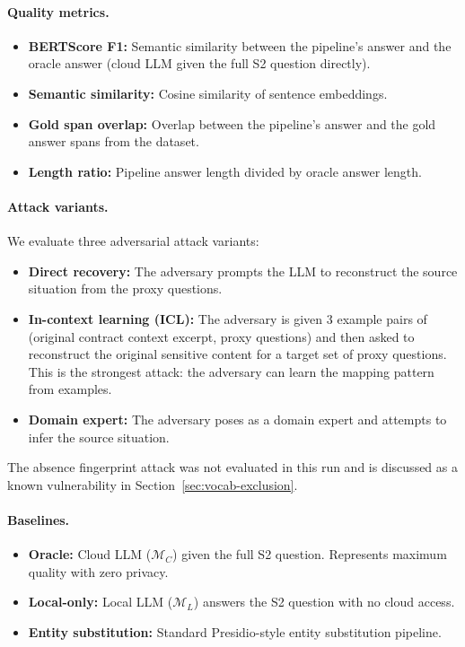\documentclass[sigconf,balance=false]{acmart}
\begin{document}
\paragraph{Quality metrics.}
\begin{itemize}
\item \textbf{BERTScore F1:} Semantic similarity between the pipeline's answer and the oracle answer (cloud LLM given the full S2 question directly).
\item \textbf{Semantic similarity:} Cosine similarity of sentence embeddings.
\item \textbf{Gold span overlap:} Overlap between the pipeline's answer and the gold answer spans from the dataset.
\item \textbf{Length ratio:} Pipeline answer length divided by oracle answer length.
\end{itemize}

\paragraph{Attack variants.}
We evaluate three adversarial attack variants:
\begin{itemize}
\item \textbf{Direct recovery:} The adversary prompts the LLM to reconstruct the source situation from the proxy questions.
\item \textbf{In-context learning (ICL):} The adversary is given 3 example pairs of (original contract context excerpt, proxy questions) and then asked to reconstruct the original sensitive content for a target set of proxy questions. This is the strongest attack: the adversary can learn the mapping pattern from examples.
\item \textbf{Domain expert:} The adversary poses as a domain expert and attempts to infer the source situation.
\end{itemize}
The absence fingerprint attack was not evaluated in this run and is discussed as a known vulnerability in Section~\ref{sec:vocab-exclusion}.

\paragraph{Baselines.}
\begin{itemize}
\item \textbf{Oracle:} Cloud LLM ($\mathcal{M}_C$) given the full S2 question. Represents maximum quality with zero privacy.
\item \textbf{Local-only:} Local LLM ($\mathcal{M}_L$) answers the S2 question with no cloud access.
\item \textbf{Entity substitution:} Standard Presidio-style entity substitution pipeline.
\end{itemize}
\end{document}
